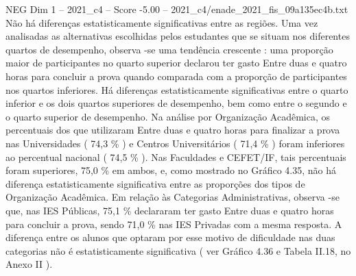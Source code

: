 \begin{textsample}{NEG Dim 1 – 2021\_c4 – Score -5.00 – 2021\_c4/enade\_2021\_fis\_09a135ec4b.txt}
Não há diferenças estatisticamente significativas entre as regiões.
Uma vez analisadas as alternativas escolhidas pelos estudantes que se situam nos diferentes quartos de desempenho, observa -se uma tendência crescente : uma proporção maior de participantes no quarto superior declarou ter gasto Entre duas e quatro horas para concluir a prova quando comparada com a proporção de participantes nos quartos inferiores.
Há diferenças estatisticamente significativas entre o quarto inferior e os dois quartos superiores de desempenho, bem como entre o segundo e o quarto superior de desempenho.
Na análise por Organização Acadêmica, os percentuais dos que utilizaram Entre duas e quatro horas para finalizar a prova nas Universidades ( 74,3 \% ) e Centros Universitários ( 71,4 \% ) foram inferiores ao percentual nacional ( 74,5 \% ).
Nas Faculdades e CEFET/IF, tais percentuais foram superiores, 75,0 \% em ambos, e, como mostrado no Gráfico 4.35, não há diferença estatisticamente significativa entre as proporções dos tipos de Organização Acadêmica.
Em relação às Categorias Administrativas, observa -se que, nas IES Públicas, 75,1 \% declararam ter gasto Entre duas e quatro horas para concluir a prova, sendo 71,0 \% nas IES Privadas com a mesma resposta.
A diferença entre os alunos que optaram por esse motivo de dificuldade nas duas categorias não é estatisticamente significativa ( ver Gráfico 4.36 e Tabela II.18, no Anexo II ).

\end{textsample}
